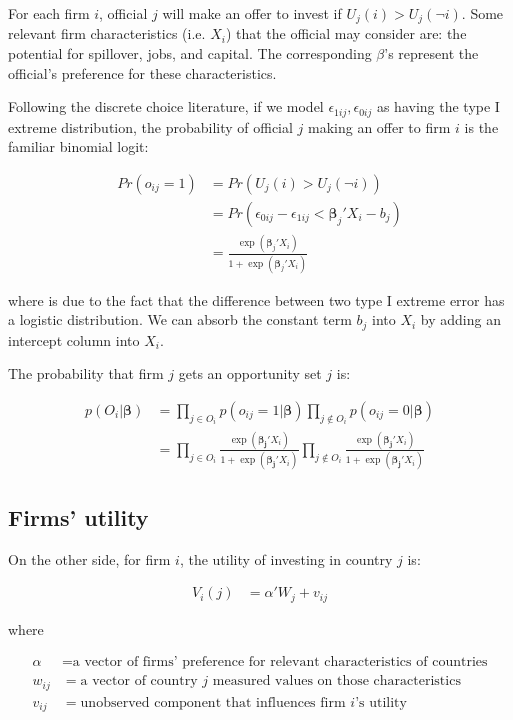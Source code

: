 \documentclass[12pt]{article}
\begin{document}
For each firm $i$, official $j$ will make an offer to invest if $U_j(i) > U_j(\neg i)$. Some relevant firm characteristics (i.e. $X_i$) that the official may consider are: the potential for spillover, jobs, and capital. The corresponding $\beta$'s represent the official's preference for these characteristics.

Following the discrete choice literature, if we model $\epsilon_{1ij}, \epsilon_{0ij}$ as having the type I extreme distribution, the probability of official $j$ making an offer to firm $i$ is the familiar binomial logit:

\begin{align}
Pr(o_{ij} = 1) &= Pr(U_j(i) > U_j(\neg i)) \\
&= Pr(\epsilon_{0ij} - \epsilon_{1ij} <  \bm{\beta}_j ' X_i - b_j) \\
&= \frac{\exp({\bm{\beta}_j'X_i})}{1 + \exp({\bm{\beta}_j'X_i})} \label{eq:prob_offer_ij}
\end{align}

where  is due to the fact that the difference between two type I extreme error has a logistic distribution. We can absorb the constant term $b_j$ into $X_i$ by adding an intercept column into $X_i$.

The probability that firm $j$ gets an opportunity set $j$ is:

\begin{align}
p(O_i | \bm{\beta}) &= \prod_{j \in O_i} p(o_{ij} = 1 | \bm{\beta}) \prod_{j \notin O_i} p(o_{ij} = 0 | \bm{\beta}) \\
&= \prod_{j \in O_i} \frac{\exp(\bm{\beta_j} ' X_i)}{1 + \exp(\bm{\beta_j}' X_i)}
 \prod_{j \notin O_i} \frac{\exp(\bm{\beta_j} ' X_i)}{1 + \exp(\bm{\beta_j}' X_i)} \label{eq:conditional_probability_of_offer}
\end{align}

\subsection{Firms' utility}

On the other side, for firm $i$, the utility of investing in country $j$ is:

\begin{align}
V_i(j) &= \alpha' W_{j} + v_{ij}
\end{align}

where

\begin{align*}
\alpha &= \text{a vector of firms' preference for relevant characteristics of countries} \\
w_{ij} &= \text{a vector of country $j$ measured values on those characteristics} \\
v_{ij} &= \text{unobserved component that influences firm $i$'s utility}
\end{align*}
\end{document}
